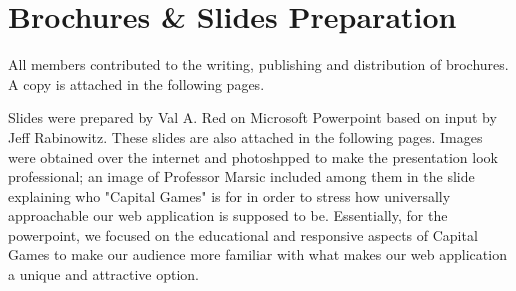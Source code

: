 \chapter{Brochures \& Slides Preparation}

All members contributed to the writing, publishing and distribution of brochures. A copy is attached in the following pages. 

Slides were prepared by Val A. Red on Microsoft Powerpoint based on input by Jeff Rabinowitz. These slides are also attached in the following pages. Images were obtained over the internet and photoshpped to make the presentation look professional; an image of Professor Marsic included among them in the slide explaining who "Capital Games" is for in order to stress how universally approachable our web application is supposed to be. Essentially, for the powerpoint, we focused on the educational and responsive aspects of Capital Games to make our audience more familiar with what makes our web application a unique and attractive option. 
